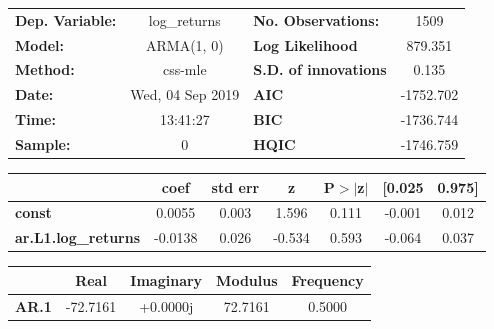 \begin{center}
\begin{tabular}{lclc}
\toprule
\textbf{Dep. Variable:}     &        log\_returns       & \textbf{  No. Observations:  } &            1509            \\
\textbf{Model:}             &         ARMA(1, 0)        & \textbf{  Log Likelihood     } &          879.351           \\
\textbf{Method:}            &          css-mle          & \textbf{  S.D. of innovations} &           0.135            \\
\textbf{Date:}              &      Wed, 04 Sep 2019     & \textbf{  AIC                } &         -1752.702          \\
\textbf{Time:}              &          13:41:27         & \textbf{  BIC                } &         -1736.744          \\
\textbf{Sample:}            &             0             & \textbf{  HQIC               } &         -1746.759          \\
\bottomrule
\end{tabular}
\begin{tabular}{lcccccc}
                            & \textbf{coef} & \textbf{std err} & \textbf{z} & \textbf{P$> |$z$|$} & \textbf{[0.025} & \textbf{0.975]}  \\
\midrule
\textbf{const}              &       0.0055  &        0.003     &     1.596  &         0.111        &       -0.001    &        0.012     \\
\textbf{ar.L1.log\_returns} &      -0.0138  &        0.026     &    -0.534  &         0.593        &       -0.064    &        0.037     \\
\bottomrule
\end{tabular}
\begin{tabular}{lcccc}
              & \textbf{            Real} & \textbf{         Imaginary} & \textbf{         Modulus} & \textbf{        Frequency}  \\
\midrule
\textbf{AR.1} &              -72.7161     &                +0.0000j     &               72.7161     &                0.5000       \\
\bottomrule
\end{tabular}
\end{center}
